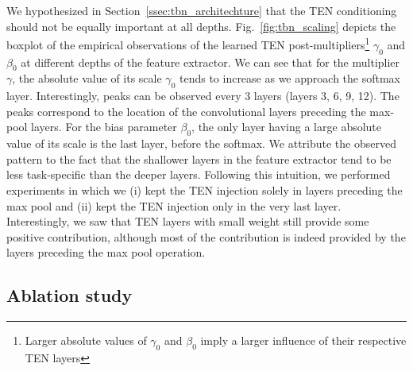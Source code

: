 \documentclass{article}
\begin{document}
We hypothesized in Section~\ref{ssec:tbn_architechture} that the TEN conditioning should not be equally important at all depths. Fig.~\ref{fig:tbn_scaling} depicts the boxplot of the empirical observations of the learned TEN post-multipliers\footnote{Larger absolute values of $\gamma_0$ and $\beta_0$ imply a larger influence of their respective TEN layers} $\gamma_0$ and $\beta_0$ at different depths of the feature extractor. We can see that for the multiplier $\gamma$, the absolute value of its scale $\gamma_0$ tends to increase as we approach the softmax layer. Interestingly, peaks can be observed every 3 layers (layers 3, 6, 9, 12). The peaks correspond to the location of the convolutional layers preceding the max-pool layers. For the bias parameter $\beta_0$, the only layer having a large absolute value of its scale is the last layer, before the softmax. We attribute the observed pattern to the fact that the shallower layers in the feature extractor tend to be less task-specific than the deeper layers. Following this intuition, we performed experiments in which we (i) kept the TEN injection solely in layers preceding the max pool and (ii) kept the TEN injection only in the very last layer. Interestingly, we saw that TEN layers with small weight still provide some positive contribution, although most of the contribution is indeed provided by the layers preceding the max pool operation.


\subsection{Ablation study} \label{ssec:multitask_ablation}
\end{document}

